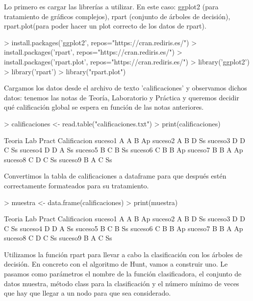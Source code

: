 \documentclass[a4paper]{article}
\begin{document}
Lo primero es cargar las librerías a utilizar. En este caso: ggplot2 (para tratamiento de gráficos complejos), rpart (conjunto de árboles de decisión), rpart.plot(para poder hacer un plot correcto de los datos de rpart).
\begin{Schunk}
\begin{Sinput}
> install.packages('ggplot2', repos="https://cran.rediris.es/")
> install.packages('rpart', repos="https://cran.rediris.es/")
> install.packages('rpart.plot', repos="https://cran.rediris.es/")
> library('ggplot2')
> library('rpart')
> library("rpart.plot")
\end{Sinput}
\end{Schunk}
Cargamos los datos desde el archivo de texto 'calificaciones' y observamos dichos datos: tenemos las notas de Teoría, Laboratorio y Práctica y queremos decidir qué calificación global se espera en función de las notas anteriores.
\begin{Schunk}
\begin{Sinput}
> calificaciones <- read.table("calificaciones.txt")
> print(calificaciones)
\end{Sinput}
\begin{Soutput}
        Teoria Lab Pract Calificacion
suceso1      A   A     B           Ap
suceso2      A   B     D           Ss
suceso3      D   D     C           Ss
suceso4      D   D     A           Ss
suceso5      B   C     B           Ss
suceso6      C   B     B           Ap
suceso7      B   B     A           Ap
suceso8      C   D     C           Ss
suceso9      B   A     C           Ss
\end{Soutput}
\end{Schunk}
Convertimos la tabla de calificaciones a dataframe para que después estén correctamente formateados para su tratamiento.
\begin{Schunk}
\begin{Sinput}
> muestra <- data.frame(calificaciones)
> print(muestra)
\end{Sinput}
\begin{Soutput}
        Teoria Lab Pract Calificacion
suceso1      A   A     B           Ap
suceso2      A   B     D           Ss
suceso3      D   D     C           Ss
suceso4      D   D     A           Ss
suceso5      B   C     B           Ss
suceso6      C   B     B           Ap
suceso7      B   B     A           Ap
suceso8      C   D     C           Ss
suceso9      B   A     C           Ss
\end{Soutput}
\end{Schunk}
Utilizamos la función rpart para llevar a cabo la clasificación con los árboles de decisión. En concreto con el algoritmo de Hunt, vamos a construir uno.
Le pasamos como parámetros el nombre de la función clasificadora, el conjunto de datos muestra, método class para la clasificación y el número mínimo de veces que hay que llegar a un nodo para que sea considerado.
\end{document}
